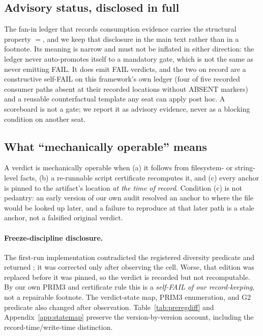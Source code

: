 \documentclass{article}
\begin{document}
\subsection{Advisory status, disclosed in full}
\label{sec:advisory}

The fan-in ledger that records consumption evidence carries the structural property
${}={}$, and we keep that disclosure in the main
text rather than in a footnote. Its meaning is narrow and must not be inflated in either
direction: the ledger never auto-promotes itself to a mandatory gate, which is not the same
as never emitting FAIL. It does emit FAIL verdicts, and the two on record are a constructive
self-FAIL on this framework's own ledger (four of five recorded consumer paths absent at
their recorded locations without ABSENT markers) and a reusable counterfactual template any
seat can apply post hoc. A scoreboard is not a gate; we report it as advisory evidence, never
as a blocking condition on another seat.

\subsection{What ``mechanically operable'' means}
\label{sec:operable}

A verdict is mechanically operable when (a) it follows from filesystem- or string-level
facts, (b) a re-runnable script certificate recomputes it, and (c) every anchor is pinned
to the artifact's location \emph{at the time of record}. Condition (c) is not pedantry: an
early version of our own audit resolved an anchor to where the file would be looked up
later, and a failure to reproduce at that later path is a stale anchor, not a falsified
original verdict.

\paragraph{Freeze-discipline disclosure.}
The first-run implementation contradicted the registered diversity predicate and returned
; it was corrected only after observing the cell. Worse, that
edition was replaced before it was pinned, so the verdict is recorded but not recomputable.
By our own PRIM3 and certificate rule this is a \emph{self-FAIL of our record-keeping}, not a
repairable footnote. The verdict-state map, PRIM3 enumeration, and G2 predicate also changed
after observation. Table~\ref{tab:preregdiff} and Appendix~\ref{app:statemap} preserve the
version-by-version account, including the record-time/write-time distinction.
\end{document}
